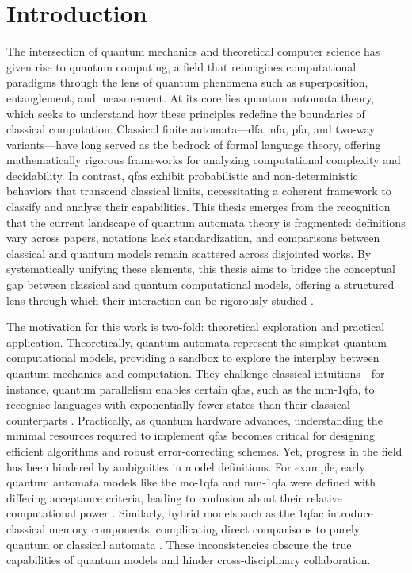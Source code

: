 \chapter{Introduction}  
\label{chap:introduction}

The intersection of quantum mechanics and theoretical computer science has given rise to quantum computing, a field that reimagines computational paradigms through the lens of quantum phenomena such as superposition, entanglement, and measurement. At its core lies quantum automata theory, which seeks to understand how these principles redefine the boundaries of classical computation. Classical finite automata—\gls{dfa}, \gls{nfa}, \gls{pfa}, and two-way variants—have long served as the bedrock of formal language theory, offering mathematically rigorous frameworks for analyzing computational complexity and decidability. In contrast, \glspl{qfa} exhibit probabilistic and non-deterministic behaviors that transcend classical limits, necessitating a coherent framework to classify and analyse their capabilities. This thesis emerges from the recognition that the current landscape of quantum automata theory is fragmented: definitions vary across papers, notations lack standardization, and comparisons between classical and quantum models remain scattered across disjointed works. By systematically unifying these elements, this thesis aims to bridge the conceptual gap between classical and quantum computational models, offering a structured lens through which their interaction can be rigorously studied \cite{ambainis2009superiority}.  

The motivation for this work is two-fold: theoretical exploration and practical application. Theoretically, quantum automata represent the simplest quantum computational models, providing a sandbox to explore the interplay between quantum mechanics and computation. They challenge classical intuitions—for instance, quantum parallelism enables certain \glspl{qfa}, such as the \gls{mm-1qfa}, to recognise languages with exponentially fewer states than their classical counterparts \cite{moore2000quantum}. Practically, as quantum hardware advances, understanding the minimal resources required to implement \glspl{qfa} becomes critical for designing efficient algorithms and robust error-correcting schemes. Yet, progress in the field has been hindered by ambiguities in model definitions. For example, early quantum automata models like the \gls{mo-1qfa} and \gls{mm-1qfa} were defined with differing acceptance criteria, leading to confusion about their relative computational power \cite{kondacs1997power}. Similarly, hybrid models such as the \gls{1qfac} introduce classical memory components, complicating direct comparisons to purely quantum or classical automata \cite{zheng2012one}. These inconsistencies obscure the true capabilities of quantum models and hinder cross-disciplinary collaboration.

